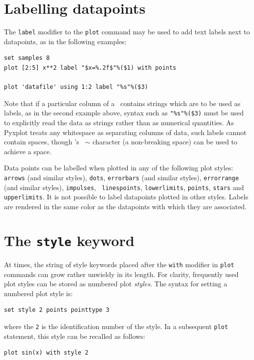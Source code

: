 \section{Labelling datapoints}

The {\tt label} modifier to the {\tt plot} command may be used to add text
labels next to datapoints, as in the following examples:
\begin{verbatim}
set samples 8
plot [2:5] x**2 label "$x=%.2f$"%($1) with points

plot 'datafile' using 1:2 label "%s"%($3)
\end{verbatim}

\noindent Note that if a particular column of a \datafile\ contains strings
which are to be used as labels, as in the second example above, syntax such as
{\tt "\%s"\%(\$3)} must be used to explicitly read the data as strings rather
than as numerical quantities.  As Pyxplot treats any whitespace as separating
columns of data, such labels cannot contain spaces, though \latexdcf's {\tt
$\sim$} character (a non-breaking space) can be used to achieve a space.

Data points can be labelled when plotted in any of the following plot styles:
{\tt arrows} (and similar styles), {\tt dots}, {\tt errorbars} (and similar
styles), {\tt errorrange} (and similar styles), {\tt impulses}, {\tt
linespoints}, {\tt lowerlimits}, {\tt points}, {\tt stars} and {\tt
upperlimits}. It is not possible to label datapoints plotted in other styles.
Labels are rendered in the same color as the datapoints with which they are
associated.

\section{The {\tt style} keyword}

At times, the string of style keywords placed after the {\tt with} modifier in
{\tt plot} commands can grow rather unwieldy in its length. For clarity,
frequently used plot styles can be stored as numbered plot {\it styles}.  The
syntax for setting a numbered plot style is:

\begin{verbatim}
set style 2 points pointtype 3
\end{verbatim}

\noindent where the {\tt 2} is the identification number of the style. In a
subsequent {\tt plot} statement, this style can be recalled as follows:

\begin{verbatim}
plot sin(x) with style 2
\end{verbatim}

